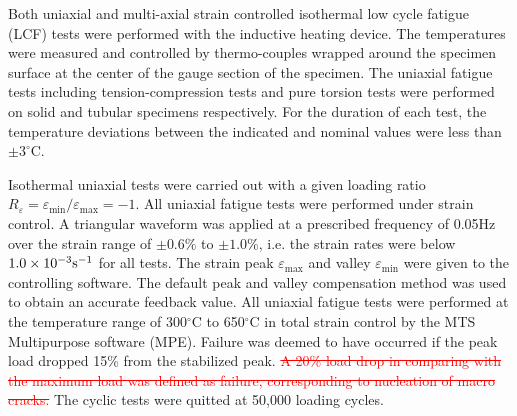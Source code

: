 \documentclass[preprint,5p,twocolumn,11pt,sort&compress]{elsarticle}
\newcommand{\marked}[1]{\textcolor{red}{#1}}
\begin{document}
Both uniaxial and multi-axial strain controlled isothermal low cycle fatigue (LCF) tests were performed with the inductive heating device. The temperatures were measured and controlled by thermo-couples wrapped around the specimen surface at the center of the gauge section of the specimen.
The uniaxial fatigue tests including tension-compression tests and pure torsion tests were performed on solid and tubular specimens respectively. For the duration of each test, the temperature deviations between the indicated and nominal values were less than $\pm3^{\circ}$C.

Isothermal uniaxial tests were carried out with a given loading ratio $R_{\varepsilon}=\varepsilon_{\min}/\varepsilon_{\max}=-1$.
All uniaxial fatigue tests were performed under strain control.
A triangular waveform was applied at a prescribed frequency of 0.05Hz over the strain range of $\pm 0.6\%$ to $\pm 1.0\%$, i.e. the strain rates were below $1.0\times 10^{-3}\rm{s}^{-1}$ for all tests.
The strain peak  $\varepsilon_{\max}$ and valley $\varepsilon_{\min}$ were given to the controlling software.
The default peak and valley compensation method was used to obtain an accurate feedback value.
All uniaxial fatigue tests were performed at the temperature range of 300$^{\circ}$C to 650$^{\circ}$C in total strain control by the MTS Multipurpose software (MPE).
Failure was deemed to have occurred if the peak load dropped 15\% from the stabilized peak. \marked{\sout{A 20\% load drop in comparing with the maximum load was defined as failure, corresponding to nucleation of macro cracks.}}
The cyclic tests were quitted at 50,000 loading cycles.

\end{document}
